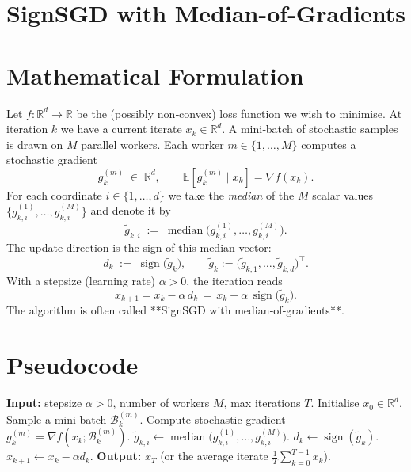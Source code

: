 \documentclass{article}
\newcommand{\sign}{\operatorname{sign}}
\newcommand{\R}{\mathbb{R}}
\begin{document}
\section*{SignSGD with Median-of-Gradients}

\section*{Mathematical Formulation}
Let $f:\R^{d}\rightarrow\R$ be the (possibly non‑convex) loss function we wish to minimise.
At iteration $k$ we have a current iterate $x_k\in\R^{d}$.
A mini‑batch of stochastic samples is drawn on $M$ parallel workers.
Each worker $m\in\{1,\dots,M\}$ computes a stochastic gradient
\[
g_k^{(m)} \;\in\; \R^{d},\qquad 
\mathbb{E}\!\left[g_k^{(m)}\mid x_k\right]=\nabla f(x_k).
\]
For each coordinate $i\in\{1,\dots,d\}$ we take the \emph{median} of the $M$ scalar
values $\{g_{k,i}^{(1)},\dots,g_{k,i}^{(M)}\}$ and denote it by
\[
\tilde g_{k,i}\;:=\;\operatorname{median}\!\bigl(g_{k,i}^{(1)},\dots,g_{k,i}^{(M)}\bigr).
\]
The update direction is the sign of this median vector:
\[
d_k \;:=\; \sign\!\bigl(\tilde g_k\bigr),\qquad 
\tilde g_k:=\bigl(\tilde g_{k,1},\dots,\tilde g_{k,d}\bigr)^{\!\top}.
\]
With a stepsize (learning rate) $\alpha>0$, the iteration reads
\begin{equation}
\boxed{\,x_{k+1}=x_k-\alpha\,d_k\,=\,x_k-\alpha\,\sign\!\bigl(\tilde g_k\bigr).\,}
\label{eq:update}
\end{equation}
The algorithm is often called **SignSGD with median‑of‑gradients**.

\section*{Pseudocode}
\begin{algorithm}[H]
\caption{SignSGD with Median‑of‑Gradients}
\begin{algorithmic}[1]
\State \textbf{Input:} stepsize $\alpha>0$, number of workers $M$, max iterations $T$.
\State Initialise $x_0\in\R^{d}$.
        \State Sample a mini‑batch $\mathcal{B}_k^{(m)}$.
        \State Compute stochastic gradient $g_k^{(m)}=\nabla f(x_k;\mathcal{B}_k^{(m)})$.
    \EndFor
        \State $\tilde g_{k,i}\gets\operatorname{median}\bigl(g_{k,i}^{(1)},\dots,g_{k,i}^{(M)}\bigr)$.
    \EndFor
    \State $d_k\gets \sign(\tilde g_k)$.
    \State $x_{k+1}\gets x_k-\alpha d_k$.
\EndFor
\State \textbf{Output:} $x_T$ (or the average iterate $\frac1T\sum_{k=0}^{T-1}x_k$).
\end{algorithmic}
\end{algorithm}
\end{document}
